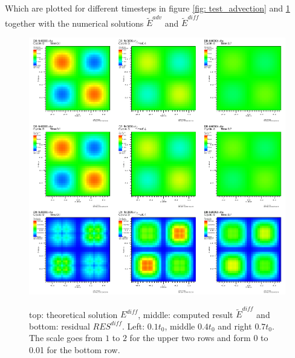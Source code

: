 Which are plotted for different timesteps in figure \ref{fig: test_advection} and \ref{fig: test_diffusion} together with the numerical solutions $\tilde{E}^{adv}$ and $\tilde{E}^{diff}$


\begin{figure}
\includegraphics[width = \textwidth]{visit0001.png}
\label{fig: test_diffusion}
\caption{top: theoretical solution $E^{diff}$, middle: computed result $\tilde{E}^{diff}$ and bottom: residual $RES^{diff}$. Left: $0.1 t_0$, middle $0.4 t_0$ and right $0.7 t_0$. The scale goes from $1$ to $2$ for the upper two rows and form 0 to 0.01 for the bottom row.}
\end{figure}

